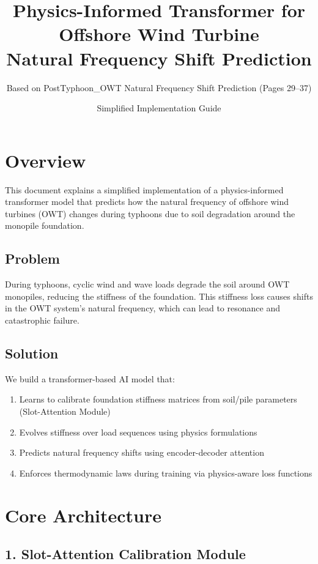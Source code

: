 \documentclass[11pt,a4paper]{article}
\title{Physics-Informed Transformer for Offshore Wind Turbine \\ Natural Frequency Shift Prediction}
\author{Based on PostTyphoon\_OWT Natural Frequency Shift Prediction (Pages 29--37)}
\date{Simplified Implementation Guide}
\begin{document}
\maketitle

\tableofcontents
\newpage

\section{Overview}

This document explains a simplified implementation of a physics-informed transformer model that predicts how the natural frequency of offshore wind turbines (OWT) changes during typhoons due to soil degradation around the monopile foundation.

\subsection{Problem}
During typhoons, cyclic wind and wave loads degrade the soil around OWT monopiles, reducing the stiffness of the foundation. This stiffness loss causes shifts in the OWT system's natural frequency, which can lead to resonance and catastrophic failure.

\subsection{Solution}
We build a transformer-based AI model that:
\begin{enumerate}
  \item Learns to calibrate foundation stiffness matrices from soil/pile parameters (Slot-Attention Module)
  \item Evolves stiffness over load sequences using physics formulations
  \item Predicts natural frequency shifts using encoder-decoder attention
  \item Enforces thermodynamic laws during training via physics-aware loss functions
\end{enumerate}

\section{Core Architecture}

\subsection{1. Slot-Attention Calibration Module}
\end{document}
